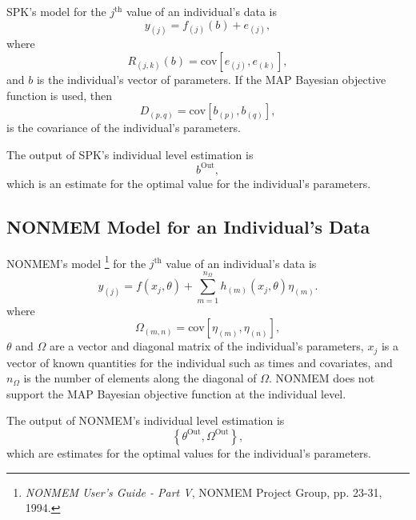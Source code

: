 \documentclass{article}
\begin{document}
SPK's model for the $j^{\mbox{th}}$ value of an individual's
data is 
  \begin{equation}
    y_{(j)} = f_{(j)}(b) + e_{(j)} ,
  \end{equation}
where
  \begin{equation}
    R_{(j,k)}(b) = \mbox{cov}[e_{(j)},e_{(k)}] ,
  \end{equation}
and $b$ is the individual's vector of parameters.
If the MAP Bayesian objective function is used, then 
  \begin{equation}
    D_{(p,q)} = \mbox{cov}[b_{(p)},b_{(q)}] ,
  \end{equation}
is the covariance of the individual's parameters.

The output of SPK's individual level estimation is
  \begin{equation}
    b^{\mbox{Out}} ,
  \end{equation}
which is an estimate for the optimal value for the individual's
parameters.


\subsection{NONMEM Model for an Individual's Data}

NONMEM's model 
\footnote{
  {\em NONMEM User's Guide - Part V}, NONMEM Project Group, 
  pp. 23-31, 1994.
} 
for the $j^{\mbox{th}}$ value of an individual's data is 
  \begin{equation}
    y_{(j)} = f(x_{j}, \theta) + 
      \sum_{m=1}^{n_{\Omega}} h_{(m)}(x_{j}, \theta) \eta_{(m)} .
  \end{equation}
where
  \begin{equation}
    \Omega_{(m,n)} = \mbox{cov}[\eta_{(m)},\eta_{(n)}] ,
  \end{equation}
$\theta$ and $\Omega$ are a vector and diagonal matrix of 
the individual's parameters, 
$x_{j}$ is a vector of known quantities for the individual
such as times and covariates,
and $n_{\Omega}$ is the number of elements along the diagonal
of $\Omega$.
NONMEM does not support the MAP Bayesian objective function
at the individual level.

The output of NONMEM's individual level estimation is
  \begin{equation}
    \left\{ \theta^{\mbox{Out}}, \Omega^{\mbox{Out}} \right\} ,
  \end{equation}
which are estimates for the optimal values for the individual's
parameters.
\end{document}

